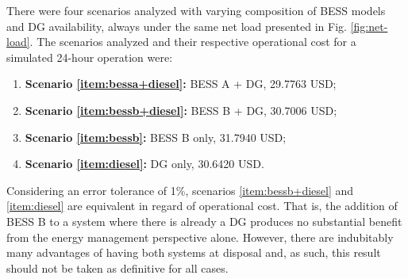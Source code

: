 \documentclass{ieeeaccess}
\begin{document}
    There were four scenarios analyzed with varying composition of \ac{BESS} models and \ac{DG} availability, always under the same net load presented in Fig. \ref{fig:net-load}. The scenarios analyzed and their respective operational cost for a simulated 24-hour operation were:
    \begin{enumerate}
        \item \label{item:bessa+diesel} \textbf{Scenario \ref{item:bessa+diesel}:} \ac{BESS} A + \ac{DG}, 29.7763 USD;
        \item \label{item:bessb+diesel} \textbf{Scenario \ref{item:bessb+diesel}:} \ac{BESS} B + \ac{DG}, 30.7006 USD;
        \item \label{item:bessb} \textbf{Scenario \ref{item:bessb}:} \ac{BESS} B only, 31.7940 USD;
        \item \label{item:diesel} \textbf{Scenario \ref{item:diesel}:} \ac{DG} only, 30.6420 USD.
    \end{enumerate}

    Considering an error tolerance of 1\%, scenarios \ref{item:bessb+diesel} and \ref{item:diesel} are equivalent in regard of operational cost. That is, the addition of \ac{BESS} B to a system where there is already a \ac{DG} produces no substantial benefit from the energy management perspective alone. However, there are indubitably many advantages of having both systems at disposal and, as such, this result should not be taken as definitive for all cases.
\end{document}
